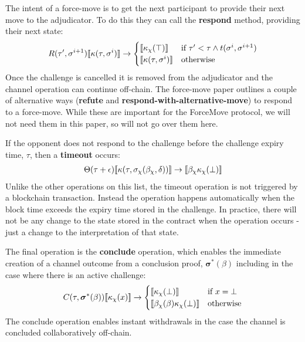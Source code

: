 The intent of a force-move is to get the next participant to provide their next move to the adjudicator. To do this they can call the \textbf{respond} method, providing their next state:
\begin{align*}
R(\tau', \sigma^{i+1})\llbracket \kappa(\tau, \sigma^i) \rrbracket \rightarrow
\begin{cases}
  \llbracket \kappa_\chi(\top) \rrbracket & \text{if } \tau' < \tau \wedge t(\sigma^i, \sigma^{i+1}) \\
  \llbracket \kappa(\tau, \sigma^i) \rrbracket &
  \text{otherwise}
\end{cases}
\end{align*}
Once the challenge is cancelled it is removed from the adjudicator and the channel operation can continue off-chain. The force-move paper \cite{} outlines a couple of alternative ways (\textbf{refute} and \textbf{respond-with-alternative-move}) to respond to a force-move. While these are important for the ForceMove protocol, we will not need them in this paper, so will not go over them here.

If the opponent does not respond to the challenge before the challenge expiry time, $\tau$, then a \textbf{timeout} occurs:
\begin{align*}
\Theta(\tau + \epsilon) \llbracket \kappa(\tau, \sigma_\chi(\beta_\chi, \delta)) \rrbracket \rightarrow \llbracket \beta_\chi \kappa_\chi(\bot) \rrbracket
\end{align*}
Unlike the other operations on this list, the timeout operation is not triggered by a
blockchain transaction. Instead the operation happens automatically when the block time
exceeds the expiry time stored in the challenge. In practice, there will not be any change 
to the state stored in the contract when the operation occurs - just a change to the
interpretation of that state. 

The final operation is the \textbf{conclude} operation, which enables the immediate creation of a channel outcome from a conclusion proof, $\bm{\sigma}^*(\beta)$ including in the case where there is an active challenge:
\begin{align*}
C(\tau, \bm{\sigma}^*(\beta)) \llbracket \kappa_\chi(x) \rrbracket \rightarrow 
\begin{cases}
  \llbracket \kappa_\chi(\bot) \rrbracket & \text{if } x = \bot \\
  \llbracket \beta_\chi(\beta) \kappa_\chi(\bot) \rrbracket &
  \text{otherwise}
\end{cases}
\end{align*}
The conclude operation enables instant withdrawals in the case the channel is concluded collaboratively off-chain.

